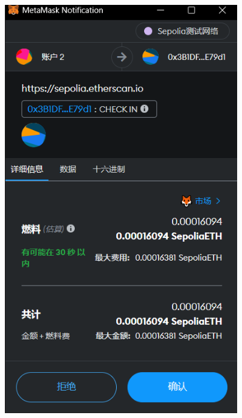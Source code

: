 \documentclass{beamer}
\begin{document}
\begin{frame}
\begin{columns}
\begin{column}{0.25\textwidth}
\begin{figure}[htbp]
                \includegraphics[width=0.9\textwidth]{s6.png}
            \end{figure}
        \end{column}
    \end{columns}

    
\end{frame}
\end{document}
